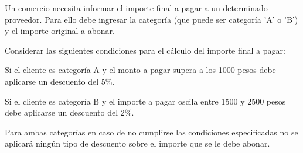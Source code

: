 Un comercio necesita informar el importe final a pagar a un determinado proveedor. Para ello debe ingresar la categoría (que puede ser categoría 'A' o 'B') y el importe original a abonar.

Considerar las siguientes condiciones para el cálculo del importe final a pagar:

Si el cliente es categoría A y el monto a pagar supera a los 1000 pesos debe aplicarse un descuento del 5\%.

Si el cliente es categoría B y el importe a pagar oscila entre 1500 y 2500 pesos debe aplicarse un descuento del 2\%.

Para ambas categorías en caso de no cumplirse las condiciones especificadas no se aplicará ningún tipo de descuento sobre el importe que se le debe abonar.

